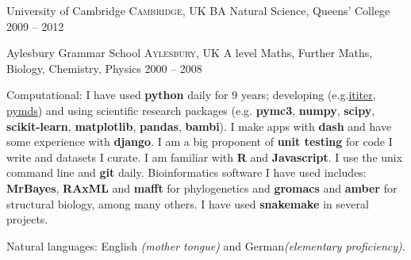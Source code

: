 \documentclass[10pt,a4paper]{article}
\begin{document}
\headedsection
{University of Cambridge}
{\textsc{Cambridge, UK}} {%
  \headedsubsection
  {BA Natural Science, Queens' College}
  {2009 -- 2012}
  {
  }
}

\headedsection
{Aylesbury Grammar School}
{\textsc{Aylesbury, UK}} {
  \headedsubsection
  {A level Maths, Further Maths, Biology, Chemistry, Physics}
  {2000 -- 2008}
  {}
}

\spacedhrule{0.5em}{-0.4em}


\inlineheadsection  %
{Computational:} {I have used \textbf{python} daily for 9 years; developing
  (e.g.\@ \href{https://ititer.readthedocs.io/}{ititer},
  \href{https://pymds.readthedocs.io}{pymds}) and using scientific research
  packages (e.g. \textbf{pymc3}, \textbf{numpy}, \textbf{scipy},
  \textbf{scikit-learn}, \textbf{matplotlib}, \textbf{pandas}, \textbf{bambi}).
  I make apps with \textbf{dash} and have some experience with \textbf{django}.
  \sbull I am a big proponent of \textbf{unit testing} for code I write and
  datasets I curate. \sbull I am familiar with \textbf{R} and
  \textbf{Javascript}. \sbull I use the unix command line and \textbf{git}
  daily. \sbull Bioinformatics software I have used includes: \textbf{MrBayes},
  \textbf{RAxML} and \textbf{mafft} for phylogenetics and \textbf{gromacs} and
  \textbf{amber} for structural biology, among many others. \sbull I have used
  \textbf{snakemake} in several projects.}

\vspace{0.5em}
\inlineheadsection
{Natural languages:}
{English \emph{(mother tongue)} and German\emph{(elementary proficiency)}.}


\spacedhrule{1.6em}{-0.4em}


\inlineheadsection
{}
{
  \renewcommand{\bibsection}{(See this list on {\href{https://scholar.google.co.uk/citations?user=q260RVcAAAAJ&hl=en}{Google scholar.)}}}
  \nocite{*}
  
}

\spacedhrule{1.6em}{-0.4em}


\end{document}
